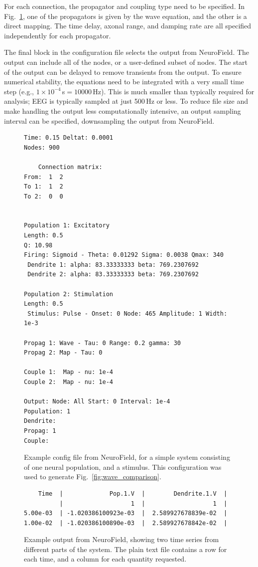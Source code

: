 \documentclass[preprint,review,10pt,authoryear,letterpaper]{elsarticle}
\begin{document}
For each connection, the propagator and coupling type need to be specified. In Fig.~\ref{fig:config_text}, one of the propagators is given by the wave equation, and the other is a direct mapping. The time delay, axonal range, and damping rate are all specified independently for each propagator. 

The final block in the configuration file selects the output from NeuroField. The output can include all of the nodes, or a user-defined subset of nodes. The start of the output can be delayed to remove transients from the output. To ensure numerical stability, the equations need to be integrated with a very small time step (e.g., $1\times10^{-4}$\,s$=10000$\,Hz). This is much smaller than typically required for analysis; EEG is typically sampled at just 500\,Hz or less. To reduce file size and make handling the output less computationally intensive, an output sampling interval can be specified, downsampling the output from NeuroField. 

\begin{figure}[!htbp]
\begin{center}
\begin{lstlisting}
Time: 0.15 Deltat: 0.0001
Nodes: 900

    Connection matrix:
From:  1  2 
To 1:  1  2  
To 2:  0  0  


Population 1: Excitatory
Length: 0.5
Q: 10.98
Firing: Sigmoid - Theta: 0.01292 Sigma: 0.0038 Qmax: 340
 Dendrite 1: alpha: 83.33333333 beta: 769.2307692
 Dendrite 2: alpha: 83.33333333 beta: 769.2307692

Population 2: Stimulation
Length: 0.5
 Stimulus: Pulse - Onset: 0 Node: 465 Amplitude: 1 Width: 1e-3 

Propag 1: Wave - Tau: 0 Range: 0.2 gamma: 30
Propag 2: Map - Tau: 0

Couple 1:  Map - nu: 1e-4
Couple 2:  Map - nu: 1e-4

Output: Node: All Start: 0 Interval: 1e-4
Population: 1
Dendrite:  
Propag: 1
Couple:  
\end{lstlisting}
\caption{Example config file from NeuroField, for a simple system consisting of one neural population, and a stimulus. This configuration was used to generate Fig.~\ref{fig:wave_comparison}.}
\label{fig:config_text}
\end{center}
\end{figure}


\begin{figure}[!b]
\begin{center}
\begin{lstlisting}
    Time  |             Pop.1.V  |        Dendrite.1.V  |
          |                   1  |                   1  |
5.00e-03  | -1.020386100923e-03  |  2.589927678839e-02  |
1.00e-02  | -1.020386100890e-03  |  2.589927678842e-02  |
\end{lstlisting}
\caption{Example output from NeuroField, showing two time series from different parts of the system. The plain text file contains a row for each time, and a column for each quantity requested.}
\label{fig:output_text}
\end{center}
\end{figure}
\end{document}
